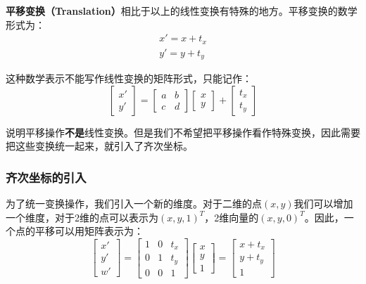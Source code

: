 \documentclass[openany]{progbookcn}
\begin{document}
\textbf{平移变换（Translation）}相比于以上的线性变换有特殊的地方。平移变换的数学形式为：
\begin{equation}
	\begin{split}
		x'=x+t_x\\
		y'=y+t_y
	\end{split}
\end{equation}

这种数学表示不能写作线性变换的矩阵形式，只能记作：
\begin{equation}
	\begin{bmatrix}x'\\y'\end{bmatrix}=\begin{bmatrix}a&b\\c&d\end{bmatrix}\begin{bmatrix}x\\y\end{bmatrix}+\begin{bmatrix}t_x\\t_y\end{bmatrix}
\end{equation}

说明平移操作\textbf{不是}线性变换。但是我们不希望把平移操作看作特殊变换，因此需要把这些变换统一起来，就引入了齐次坐标。

\subsubsection{齐次坐标的引入}

为了统一变换操作，我们引入一个新的维度。对于二维的点$(x,y)$我们可以增加一个维度，对于2维的点可以表示为$(x,y,1)^T$，2维向量的$(x,y,0)^T$。因此，一个点的平移可以用矩阵表示为：
\begin{equation}
	\begin{bmatrix}x'\\y'\\w'\end{bmatrix}=\begin{bmatrix}1&0&t_x\\0&1&t_y\\0&0&1\end{bmatrix}\begin{bmatrix}x\\y\\1\end{bmatrix}=\begin{bmatrix}x+t_x\\y+t_y\\1\end{bmatrix}
\end{equation}
\end{document}
